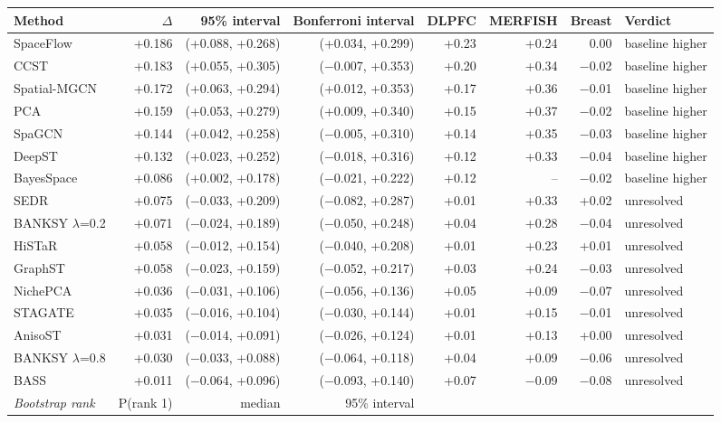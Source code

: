 \scriptsize
\begin{tabular}{lrrrrrrl}
\toprule
Method & $\Delta$ & 95\% interval & Bonferroni interval & DLPFC & MERFISH & Breast & Verdict \\
\midrule
SpaceFlow & +0.186 & (+0.088, +0.268) & (+0.034, +0.299) & +0.23 & +0.24 & 0.00 & baseline higher \\
CCST & +0.183 & (+0.055, +0.305) & ($-$0.007, +0.353) & +0.20 & +0.34 & $-$0.02 & baseline higher \\
Spatial-MGCN & +0.172 & (+0.063, +0.294) & (+0.012, +0.353) & +0.17 & +0.36 & $-$0.01 & baseline higher \\
PCA & +0.159 & (+0.053, +0.279) & (+0.009, +0.340) & +0.15 & +0.37 & $-$0.02 & baseline higher \\
SpaGCN & +0.144 & (+0.042, +0.258) & ($-$0.005, +0.310) & +0.14 & +0.35 & $-$0.03 & baseline higher \\
DeepST & +0.132 & (+0.023, +0.252) & ($-$0.018, +0.316) & +0.12 & +0.33 & $-$0.04 & baseline higher \\
BayesSpace & +0.086 & (+0.002, +0.178) & ($-$0.021, +0.222) & +0.12 & -- & $-$0.02 & baseline higher \\
SEDR & +0.075 & ($-$0.033, +0.209) & ($-$0.082, +0.287) & +0.01 & +0.33 & +0.02 & unresolved \\
BANKSY $\lambda$=0.2 & +0.071 & ($-$0.024, +0.189) & ($-$0.050, +0.248) & +0.04 & +0.28 & $-$0.04 & unresolved \\
HiSTaR & +0.058 & ($-$0.012, +0.154) & ($-$0.040, +0.208) & +0.01 & +0.23 & +0.01 & unresolved \\
GraphST & +0.058 & ($-$0.023, +0.159) & ($-$0.052, +0.217) & +0.03 & +0.24 & $-$0.03 & unresolved \\
NichePCA & +0.036 & ($-$0.031, +0.106) & ($-$0.056, +0.136) & +0.05 & +0.09 & $-$0.07 & unresolved \\
STAGATE & +0.035 & ($-$0.016, +0.104) & ($-$0.030, +0.144) & +0.01 & +0.15 & $-$0.01 & unresolved \\
AnisoST & +0.031 & ($-$0.014, +0.091) & ($-$0.026, +0.124) & +0.01 & +0.13 & +0.00 & unresolved \\
BANKSY $\lambda$=0.8 & +0.030 & ($-$0.033, +0.088) & ($-$0.064, +0.118) & +0.04 & +0.09 & $-$0.06 & unresolved \\
BASS & +0.011 & ($-$0.064, +0.096) & ($-$0.093, +0.140) & +0.07 & $-$0.09 & $-$0.08 & unresolved \\
\midrule
\emph{Bootstrap rank} & P(rank 1) & median & 95\% interval &  &  &  &  \\

\end{tabular}
